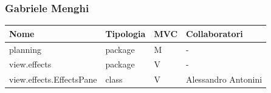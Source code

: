 \documentclass[a4paper,12pt]{report}
\begin{document}
\subsubsection{Gabriele Menghi}
\begin{center}
\begin{longtable}{| m{22.5em} | m{2cm}| m{1cm} | m{2.7cm} |} 
 \hline
 \textbf{Nome} & \textbf{Tipologia} & \textbf{MVC} & \textbf{Collaboratori} \\ [0.5ex]
 \hline
  planning & package & M & - \\
 \hline
 view.effects & package & V & - \\
 \hline
view.effects.EffectsPane & class & V & Alessandro Antonini \\
\hline
 \end{longtable}
 \end{center}
\end{document}
